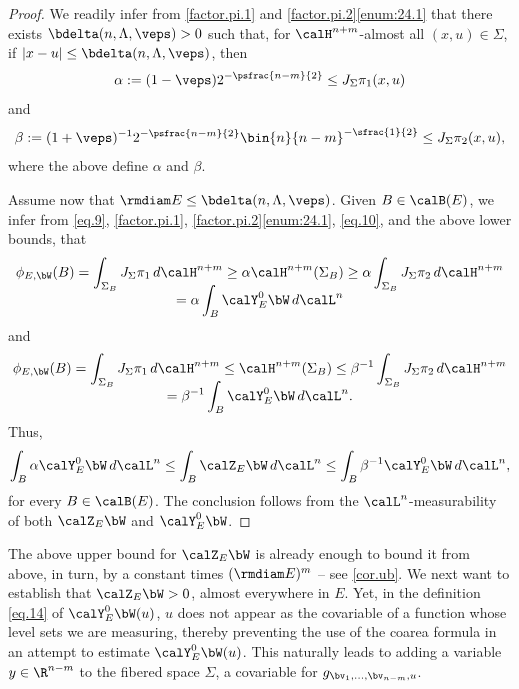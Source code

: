 \begin{proof}
We readily infer from \ref{factor.pi.1} and \ref{factor.pi.2}\eqref{enum:24.1} that there exists $\bdelta(n,\Lambda,\veps) > 0$ such that, for $\calH^{n+m}$-almost all $(x,u) \in \Sigma$, if $|x-u| \leq \bdelta(n,\Lambda,\veps)$, then
\begin{equation}
\alpha:= (1-\veps) 2^{-\psfrac{n-m}{2}} \leq J_\Sigma \pi_1(x,u)
\end{equation}
and\vspace*{-5pt}
\begin{equation}
\beta:= (1+\veps)^{-1} 2^{-\psfrac{n-m}{2}} \bin{n}{n-m}^{-\sfrac{1}{2}} \leq J_\Sigma \pi_2(x,u),
\end{equation}
where the above define $\alpha$ and $\beta$.
\par
Assume now that $\rmdiam E \leq \bdelta(n,\Lambda,\veps)$.
Given $B \in \calB(E)$, we infer from \eqref{eq.9}, \ref{factor.pi.1}, \ref{factor.pi.2}\eqref{enum:24.1}, \eqref{eq.10}, and the above lower bounds, that\vspace*{-5pt}
\begin{multline*}
\phi_{E,\bW}(B) = \int_{\Sigma_B} J_\Sigma \pi_1 \,d\calH^{n+m}
\geq \alpha \calH^{n+m}(\Sigma_B)
\geq \alpha \int_{\Sigma_B} J_\Sigma \pi_2 \,d\calH^{n+m} \\[-8pt]
= \alpha \int_B \calY^0_E \bW \,d\calL^n
\end{multline*}
and\vspace*{-5pt}
\begin{multline*}
\phi_{E,\bW}(B) = \int_{\Sigma_B} J_\Sigma \pi_1 \,d\calH^{n+m} \leq \calH^{n+m}(\Sigma_B) \leq \beta^{-1} \int_{\Sigma_B} J_\Sigma \pi_2 \,d\calH^{n+m} \\[-8pt]
= \beta^{-1} \int_B \calY^0_E \bW \,d\calL^n.
\end{multline*}
Thus,\vspace*{-3pt}
\begin{equation*}
\int_B \alpha\calY^0_E \bW \,d\calL^n \leq \int_B \calZ_E \bW \,d\calL^n \leq \int_B \beta^{-1} \calY^0_E \bW \,d\calL^n,
\end{equation*}
for every $B \in \calB(E)$.
The conclusion follows from the $\calL^n$-measurability of both $\calZ_E \bW$ and $\calY^0_E \bW$.
\end{proof}

\begin{Empty}
The above upper bound for $\calZ_E \bW$ is already enough to bound it from above, in turn, by a constant times $(\rmdiam E)^m$ -- see \ref{cor.ub}.
We next want to establish that $\calZ_E \bW > 0$, almost everywhere in $E$.
Yet, in the definition \eqref{eq.14} of $\calY^0_E \bW(u)$, $u$ does not appear as the covariable of a function whose level sets we are measuring, thereby preventing the use of the coarea formula in an attempt to estimate $\calY^0_E \bW(u)$.
This naturally leads to adding a variable $y \in \R^{n-m}$ to the fibered space $\Sigma$, a covariable for $g_{\bv_1,\ldots,\bv_{n-m},u}$.
\end{Empty}

